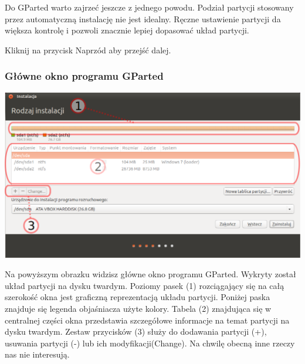 Do GParted warto zajrzeć jeszcze z jednego powodu. Podział partycji stosowany przez automatyczną instalację nie jest idealny. Ręczne ustawienie partycji da większa kontrolę i pozwoli znacznie lepiej dopasować układ partycji.
\begin{flushright}
Kliknij na przycisk \textcolor{ubuntu_orange}{Naprzód} aby przejść dalej.
\end{flushright}
\clearpage
\subsubsection{Główne okno programu GParted}
\begin{center}
        \includegraphics[width=\linewidth]{images/instalator_partycjonowanie_gparted2.png}
\end{center}

Na powyższym obrazku widzisz główne okno programu GParted. Wykryty został układ partycji na dysku twardym. Poziomy pasek \textcolor{ubuntu_orange}{(}1\textcolor{ubuntu_orange}{)} rozciągający się na całą szerokość okna jest graficzną reprezentacją układu partycji. Poniżej paska znajduje się legenda objaśniacza użyte kolory. Tabela \textcolor{ubuntu_orange}{(}2\textcolor{ubuntu_orange}{)} znajdująca się w centralnej części okna przedstawia szczegółowe informacje na temat partycji na dysku twardym. Zestaw przycisków \textcolor{ubuntu_orange}{(}3\textcolor{ubuntu_orange}{)} służy do dodawania partycji (\textcolor{ubuntu_orange}{+}), usuwania partycji (\textcolor{ubuntu_orange}{-}) lub ich modyfikacji(\textcolor{ubuntu_orange}{Change}). Na chwilę obecną inne rzeczy nas nie interesują.

